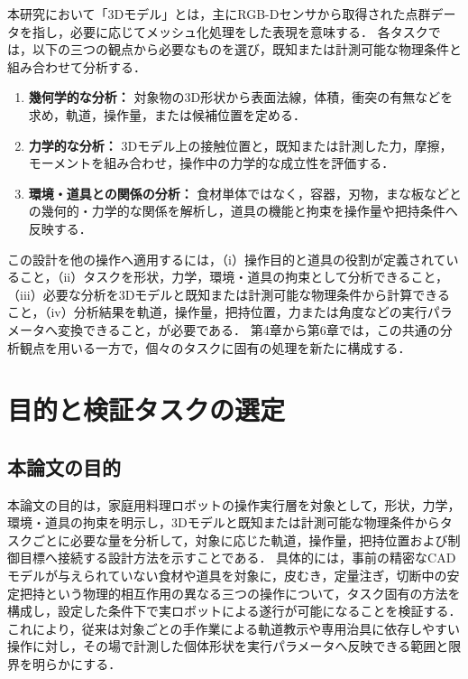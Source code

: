 \begin{revisionblock}
本研究において「3Dモデル」とは，主にRGB-Dセンサから取得された点群データを指し，必要に応じてメッシュ化処理をした表現を意味する．
各タスクでは，以下の三つの観点から必要なものを選び，既知または計測可能な物理条件と組み合わせて分析する．

\begin{enumerate}
    \item \textbf{幾何学的な分析：} 対象物の3D形状から表面法線，体積，衝突の有無などを求め，軌道，操作量，または候補位置を定める．
    
    \item \textbf{力学的な分析：} 3Dモデル上の接触位置と，既知または計測した力，摩擦，モーメントを組み合わせ，操作中の力学的な成立性を評価する．
    
    \item \textbf{環境・道具との関係の分析：} 食材単体ではなく，容器，刃物，まな板などとの幾何的・力学的な関係を解析し，道具の機能と拘束を操作量や把持条件へ反映する．
\end{enumerate}

この設計を他の操作へ適用するには，（i）操作目的と道具の役割が定義されていること，（ii）タスクを形状，力学，環境・道具の拘束として分析できること，（iii）必要な分析を3Dモデルと既知または計測可能な物理条件から計算できること，（iv）分析結果を軌道，操作量，把持位置，力または角度などの実行パラメータへ変換できること，が必要である．
第4章から第6章では，この共通の分析観点を用いる一方で，個々のタスクに固有の処理を新たに構成する．
\end{revisionblock}

\section{目的と検証タスクの選定}

\subsection{本論文の目的}

\begin{revisionblock}
本論文の目的は，家庭用料理ロボットの操作実行層を対象として，形状，力学，環境・道具の拘束を明示し，3Dモデルと既知または計測可能な物理条件からタスクごとに必要な量を分析して，対象に応じた軌道，操作量，把持位置および制御目標へ接続する設計方法を示すことである．
具体的には，事前の精密なCADモデルが与えられていない食材や道具を対象に，皮むき，定量注ぎ，切断中の安定把持という物理的相互作用の異なる三つの操作について，タスク固有の方法を構成し，設定した条件下で実ロボットによる遂行が可能になることを検証する．
これにより，従来は対象ごとの手作業による軌道教示や専用治具に依存しやすい操作に対し，その場で計測した個体形状を実行パラメータへ反映できる範囲と限界を明らかにする．
\end{revisionblock}

